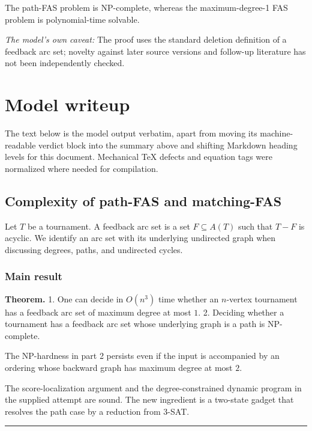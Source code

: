 \documentclass[
  11pt,
  a4paper,
]{article}
\begin{document}
The path-FAS problem is NP-complete, whereas the maximum-degree-1 FAS
problem is polynomial-time solvable.

\emph{The model's own caveat:} The proof uses the standard deletion
definition of a feedback arc set; novelty against later source versions
and follow-up literature has not been independently checked.

\section{Model writeup}\label{model-writeup}

The text below is the model output verbatim, apart from moving its
machine-readable verdict block into the summary above and shifting
Markdown heading levels for this document. Mechanical TeX defects and
equation tags were normalized where needed for compilation.

\subsection{Complexity of path-FAS and
matching-FAS}\label{complexity-of-path-fas-and-matching-fas}

Let \(T\) be a tournament. A feedback arc set is a set
\(F\subseteq A(T)\) such that \(T-F\) is acyclic. We identify an arc set
with its underlying undirected graph when discussing degrees, paths, and
undirected cycles.

\subsubsection{Main result}\label{main-result}

\textbf{Theorem.} 1. One can decide in \(O(n^3)\) time whether an
\(n\)-vertex tournament has a feedback arc set of maximum degree at most
\(1\). 2. Deciding whether a tournament has a feedback arc set whose
underlying graph is a path is NP-complete.

The NP-hardness in part 2 persists even if the input is accompanied by
an ordering whose backward graph has maximum degree at most \(2\).

The score-localization argument and the degree-constrained dynamic
program in the supplied attempt are sound. The new ingredient is a
two-state gadget that resolves the path case by a reduction from 3-SAT.

\begin{center}\rule{0.5\linewidth}{0.5pt}\end{center}
\end{document}
